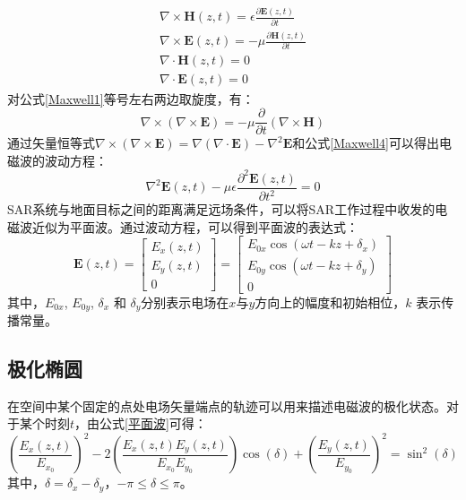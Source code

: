 \documentclass[promaster]{thesis-uestc}
\begin{document}
\begin{gather}
    \label{Maxwell1}
    \nabla \times \boldsymbol{H}(z,t)=\epsilon \frac{\partial \boldsymbol{E}(z,t)}{\partial t} \\
    \nabla \times \boldsymbol{E}(z,t)=-\mu \frac{\partial \boldsymbol{H}(z,t)}{\partial t}     \\
    \nabla \cdot \boldsymbol{H}(z,t)=0                                                         \\
    \label{Maxwell4}
    \nabla \cdot \boldsymbol{E}(z,t)=0
\end{gather}
对公式\ref{Maxwell1}等号左右两边取旋度，有：
\begin{equation}
    \nabla \times(\nabla \times \boldsymbol{E})=-\mu \frac{\partial}{\partial t}(\nabla \times \boldsymbol{H})
\end{equation}
通过矢量恒等式$\nabla \times(\nabla \times \boldsymbol{E})=\nabla(\nabla \cdot \boldsymbol{E})-\nabla^2 \boldsymbol{E}$和公式\ref{Maxwell4}可以得出电磁波的波动方程：
\begin{equation}
    \nabla^2 \boldsymbol{E}(z, t)-\mu \epsilon \frac{\partial^2 \boldsymbol{E}(z, t)}{\partial t^2}=0
\end{equation}
SAR系统与地面目标之间的距离满足远场条件，可以将SAR工作过程中收发的电磁波近似为平面波。通过波动方程，可以得到平面波的表达式：
\begin{equation}
    \label{平面波}
    \boldsymbol{E}(z, t)=\left[\begin{array}{c}
            E_x(z, t) \\
            E_y(z, t) \\
            0
        \end{array}\right]=\left[\begin{array}{c}
            E_{0 x} \cos \left(\omega t-k z+\delta_x\right) \\
            E_{0 y} \cos \left(\omega t-k z+\delta_y\right) \\
            0
        \end{array}\right]
\end{equation}
其中，$E_{0x}$, $E_{0y}$, $\delta_x$ 和 $\delta_y$分别表示电场在$x$与$y$方向上的幅度和初始相位，$k$ 表示传播常量。
\subsection{极化椭圆}
在空间中某个固定的点处电场矢量端点的轨迹可以用来描述电磁波的极化状态。对于某个时刻$t$，由公式\ref{平面波}可得：
\begin{equation}
    \label{轨迹方程}
    \left(\frac{E_x(z, t)}{E_{x_0}}\right)^2-2\left(\frac{E_x(z, t) E_y(z, t)}{E_{x_0} E_{y_0}}\right) \cos (\delta)+\left(\frac{E_y(z, t)}{E_{y_0}}\right)^2=\sin ^2(\delta)
\end{equation}
其中，$\delta=\delta_x-\delta_y$，$-\pi \leqslant \delta \leqslant \pi$。
\end{document}
